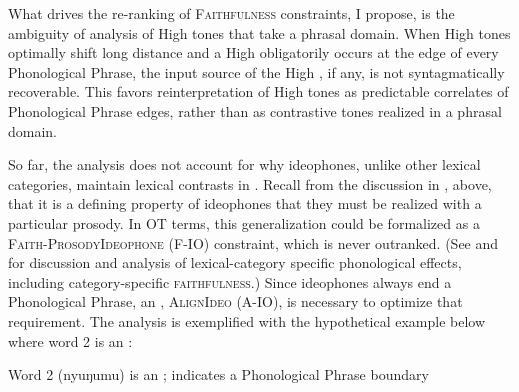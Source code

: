 \documentclass[output=paper,newtxmath,modfonts,nonflat,draft]{langsci/langscibook}
\begin{document}
What drives the re-ranking of \textsc{Faithfulness} constraints, I propose, is the ambiguity of analysis of High tones that take a phrasal domain. When High tones optimally shift long distance and a High  obligatorily occurs at the edge of every Phonological Phrase, the input source of the High , if any, is not syntagmatically recoverable. This favors reinterpretation of High tones as predictable correlates of Phonological Phrase edges, rather than as contrastive tones realized in a phrasal domain.

So far, the analysis does not account for why ideophones, unlike other lexical categories, maintain lexical  contrasts in . Recall from the discussion in , above, that it is a defining property of ideophones that they must be realized with a particular prosody. In OT terms, this generalization could be formalized as a \textsc{Faith-ProsodyIdeophone} (\textsc{F-IO}) constraint, which is never outranked. (See \citealt{Shih&Inkelas2015} and \citealt{Smith2011} for discussion and analysis of lexical-category specific phonological effects, including category-specific \textsc{faithfulness}.) Since ideophones always end a Phonological Phrase, an , \textsc{AlignIdeo} (\textsc{A-IO}), is necessary to optimize that requirement. The analysis is exemplified with the hypothetical example below where word 2 is an :


\ea\label{ex:downing:25}  Word 2 (nyuŋumu) is an ; {\textbar} indicates a Phonological   Phrase boundary

\footnotesize
{}
\z
\normalsize
\end{document}
